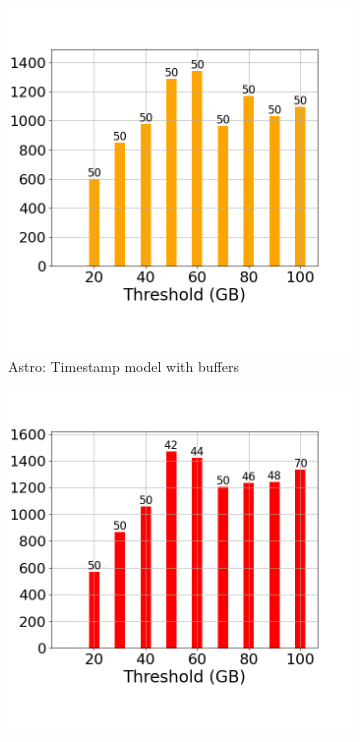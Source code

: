 \begin{figure}
\begin{subfigure}[c]{0.48\textwidth}
		\includegraphics[width=1\textwidth]	 {figures/Experiments/Dynamic/ASTRO/Batch_processing/60/average_query_time_per_batch_version_999777018_10485760_10_delay[60].png}
		\caption{Astro: Timestamp model with buffers}
		\label{fig:system-ts-60-astro}
	\end{subfigure}
	\begin{subfigure}[c]{0.48\textwidth}
		\includegraphics[width=1\textwidth]	 {figures/Experiments/Dynamic/ASTRO/Batch_processing/60/average_query_time_per_batch_version_999777016_10485760_10_delay[60].png}

\end{subfigure}
\end{figure}
